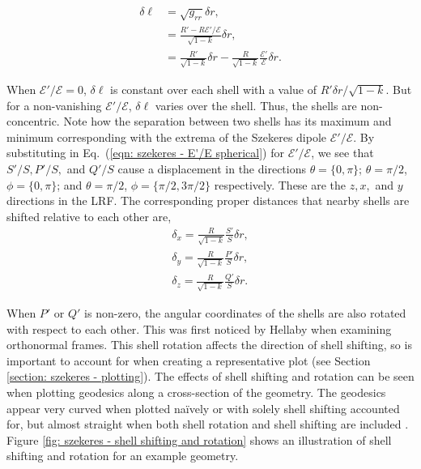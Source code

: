 \documentclass[a4paper,12pt]{report}
\renewcommand{\eqref}[1]{Eq.~({#1})}
\begin{document}
\begin{align}
  \delta \ell  &= \sqrt{g_{rr}}\delta r, \\
            &= \frac{R' - R\mathcal{E}'/\mathcal{E}}{\sqrt{1-k}} \delta r, \\
            &= \frac{R'}{\sqrt{1-k}} \delta r - \frac{R}{\sqrt{1-k}}\frac{\mathcal{E}'}{\mathcal{E}} \delta r. \label{eqn: szekeres - shell displacement 1}
\end{align}

When $\mathcal{E}'/\mathcal{E} = 0$, $\delta \ell$ is constant over each shell with a value of $R' \delta r/\sqrt{1-k}$. But for a non-vanishing $\mathcal{E}'/\mathcal{E}$, $\delta\ell$ varies over the shell. Thus, the shells are non-concentric. Note how the separation between two shells has its maximum and minimum corresponding with the extrema of the Szekeres dipole $\mathcal{E}'/\mathcal{E}$. By substituting in \eqref{\ref{eqn: szekeres - E'/E spherical}} for $\mathcal{E}'/\mathcal{E}$, we see that $S'/S, P'/S,$ and $Q'/S$ cause a displacement in the directions
$\theta = \{0, \pi\}$;
$\theta = \pi/2$, $\phi = \{0,\pi\}$; and
$\theta = \pi/2$, $\phi=\{\pi/2, 3\pi/2\}$ respectively. These are the $z, x,$ and $y$ directions in the LRF. The corresponding proper distances that nearby shells are shifted relative to each other are,
\begin{subequations}
  \begin{align}
    \delta_x = \frac{R}{\sqrt{1-k}} \frac{S'}{S} \delta r, \\
    \delta_y = \frac{R}{\sqrt{1-k}} \frac{P'}{S} \delta r, \\
    \delta_z = \frac{R}{\sqrt{1-k}} \frac{Q'}{S} \delta r.
  \end{align}
\end{subequations}

When $P'$ or $Q'$ is non-zero, the angular coordinates of the shells are also rotated with respect to each other. This was first noticed by Hellaby \cite{RN11} when examining orthonormal frames. This shell rotation affects the direction of shell shifting, so is important to account for when creating a representative plot (see Section \ref{section: szekeres - plotting}). The effects of shell shifting and rotation can be seen when plotting geodesics along a cross-section of the geometry. The geodesics appear very curved when plotted na\"ively or with solely shell shifting accounted for, but almost straight when both shell rotation and shell shifting are included \cite{RN1}.
Figure \ref{fig: szekeres - shell shifting and rotation} shows an illustration of shell shifting and rotation for an example geometry.
\end{document}
